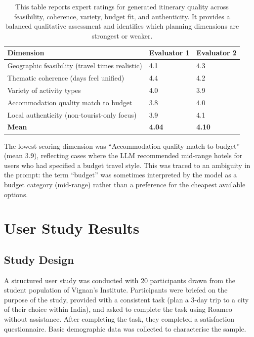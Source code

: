 \documentclass[12pt,a4paper]{report}
\newcommand{\tableexpl}[1]{\caption*{\small #1}}
\begin{document}
\begin{table}[H]
\centering
\caption{Expert Itinerary Quality Ratings (n=20 itineraries, Scale 1--5)}
\tableexpl{This table reports expert ratings for generated itinerary quality across feasibility, coherence, variety, budget fit, and authenticity. It provides a balanced qualitative assessment and identifies which planning dimensions are strongest or weaker.}
\label{tab:itinerary_quality}
\begin{tabular}{lll}
\toprule
\textbf{Dimension} & \textbf{Evaluator 1} & \textbf{Evaluator 2} \\
\midrule
Geographic feasibility (travel times realistic)  & 4.1 & 4.3 \\
Thematic coherence (days feel unified)           & 4.4 & 4.2 \\
Variety of activity types                        & 4.0 & 3.9 \\
Accommodation quality match to budget            & 3.8 & 4.0 \\
Local authenticity (non-tourist-only focus)      & 3.9 & 4.1 \\
\textbf{Mean}                                    & \textbf{4.04} & \textbf{4.10} \\
\bottomrule
\end{tabular}
\end{table}

The lowest-scoring dimension was ``Accommodation quality match to budget'' (mean 3.9), reflecting cases where the LLM recommended mid-range hotels for users who had specified a budget travel style. This was traced to an ambiguity in the prompt: the term ``budget'' was sometimes interpreted by the model as a budget category (mid-range) rather than a preference for the cheapest available options.

\section{User Study Results}

\subsection{Study Design}

A structured user study was conducted with 20 participants drawn from the student population of Vignan's Institute. Participants were briefed on the purpose of the study, provided with a consistent task (plan a 3-day trip to a city of their choice within India), and asked to complete the task using Roameo without assistance. After completing the task, they completed a satisfaction questionnaire. Basic demographic data was collected to characterise the sample.
\end{document}
